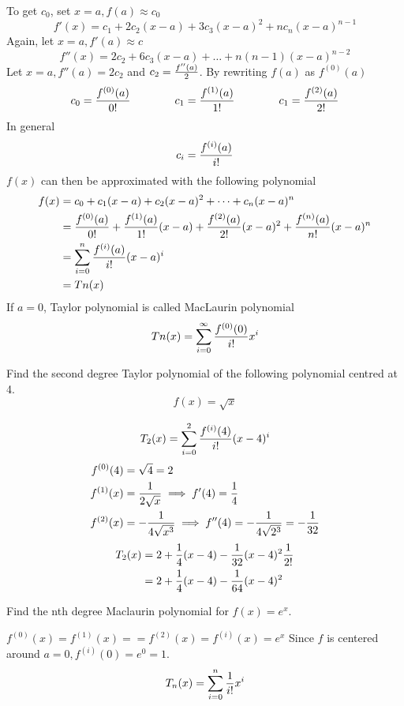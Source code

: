 \documentclass[english, 12pt]{article}
\begin{document}
To get $c_{0}$, set $x=a, f(a) \approx c_{0}$
\[f'(x) = c_{1} + 2 c_{2}(x-a) + 3 c_{3} (x-a)^2 + n c_{n} (x-a)^{n-1}\]
Again, let $x = a, f'(a) \approx c$
\[f''(x) = 2c_{2} + 6 c_{3} (x-a) + \dots + n(n-1) (x-a)^{n-2}\]
Let $x=a, f''(a) = 2c_{2}$ and $c_{2} = \frac{f''(a)}{2}$.\n
By rewriting $f(a)$ as $f^{(0)} (a)$
\[ c_{0} = \frac{f^{(0)}(a)}{0!} \qquad \qquad c_{1} = \frac{f^{(1)}(a)}{1!} \qquad \qquad  c_{1} = \frac{f^{(2)}(a)}{2!}\]
In general
\[ c_{i} = \frac{f^{(i)}(a)}{i!}\]
$f(x)$ can then be approximated with the following polynomial
\begin{align*}
f(x) &= c_{0} + c_{1} (x-a) + c_{2} (x-a)^2 + \dots + c_{n} (x-a)^n\\
&= \frac{f^{(0)}(a)}{0!} + \frac{f^{(1)}(a)}{1!} (x-a) + \frac{f^{(2)}(a)}{2!} (x-a)^2 + \frac{f^{(n)}(a)}{n!} (x-a)^n\\
&= \sum_{i=0}^n \frac{f^{(i)}(a)}{i!} (x-a)^i\\
&= Tn(x)
\end{align*}
If $a = 0$, Taylor polynomial is called MacLaurin polynomial
\[ Tn(x) = \sum_{i=0}^\infty \frac{f^{(0)} (0)}{i!} x^i \]
\begin{exmp}
Find the second degree Taylor polynomial of the following polynomial centred at 4.
\[f(x) = \sqrt{x}\]
\begin{sol}
\[ T_{2} (x) = \sum_{i=0}^2 \frac{f^{(i)} (4)}{i!} (x-4)^i\]
\begin{align*}
 f^{(0)}(4) &= \sqrt{4} = 2\\
 f^{(1)} (x) &= \frac{1}{2 \sqrt{x}} \implies f'(4) = \frac{1}{4}\\
 f^{(2)} (x) &= - \frac{1}{4 \sqrt{x^3}} \implies f''(4) = - \frac{1}{4 \sqrt{2^3}} = - \frac{1}{32}
\end{align*}
\begin{align*}
T_{2} (x) &= 2 + \frac{1}{4} (x-4) - \frac{1}{32} (x-4)^2 \frac{1}{2!}\\
&= 2 + \frac{1}{4} (x-4) - \frac{1}{64} (x-4)^2
\end{align*}
\end{sol}
\end{exmp}
\begin{exmp}
Find the nth degree Maclaurin polynomial for $f(x) = e^x$.
\begin{sol}
$f^{(0)} (x)=f^{(1)} (x)== f^{(2)} (x) = f^{(i)} (x)=e^x$
Since $f$ is centered around $a=0, f^{(i)} (0) = e^0 = 1$.
\[T_{n} (x) = \sum_{i=0}^n \frac{1}{i!} x^i\]
\end{sol}
\end{exmp}
\end{document}
